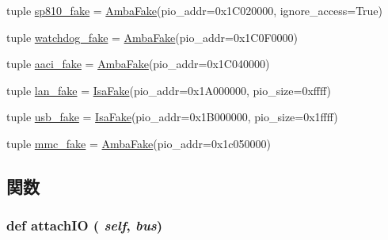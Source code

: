 \begin{DoxyCompactItemize}
\item 
tuple \hyperlink{classRealView_1_1VExpress__EMM_a42d6450a02aa42b77cd21f39eb6a3fbb}{sp810\_\-fake} = \hyperlink{classRealView_1_1AmbaFake}{AmbaFake}(pio\_\-addr=0x1C020000, ignore\_\-access=True)
\item 
tuple \hyperlink{classRealView_1_1VExpress__EMM_a6dfafd229651b87c734e8433a613a8a4}{watchdog\_\-fake} = \hyperlink{classRealView_1_1AmbaFake}{AmbaFake}(pio\_\-addr=0x1C0F0000)
\item 
tuple \hyperlink{classRealView_1_1VExpress__EMM_a40e0278b62fc0e814579ee52118d2e2a}{aaci\_\-fake} = \hyperlink{classRealView_1_1AmbaFake}{AmbaFake}(pio\_\-addr=0x1C040000)
\item 
tuple \hyperlink{classRealView_1_1VExpress__EMM_a3a27dd3a4703e03c24a604aa3c577004}{lan\_\-fake} = \hyperlink{classIsaFake}{IsaFake}(pio\_\-addr=0x1A000000, pio\_\-size=0xffff)
\item 
tuple \hyperlink{classRealView_1_1VExpress__EMM_af101373cb13814b6dbc0ab92b33cd0f4}{usb\_\-fake} = \hyperlink{classIsaFake}{IsaFake}(pio\_\-addr=0x1B000000, pio\_\-size=0x1ffff)
\item 
tuple \hyperlink{classRealView_1_1VExpress__EMM_aea1f4d5125bc4930882b7415e32696dc}{mmc\_\-fake} = \hyperlink{classRealView_1_1AmbaFake}{AmbaFake}(pio\_\-addr=0x1c050000)
\end{DoxyCompactItemize}


\subsection{関数}
\hypertarget{classRealView_1_1VExpress__EMM_ac750675f6d6de3ad52f8c5b03ee45a65}{
\subsubsection[{attachIO}]{\setlength{\rightskip}{0pt plus 5cm}def attachIO ( {\em self}, \/   {\em bus})}}
\label{classRealView_1_1VExpress__EMM_ac750675f6d6de3ad52f8c5b03ee45a65}



